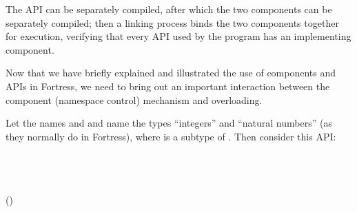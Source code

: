 The API can be separately compiled, after which the
two components can be separately compiled; then a linking
process binds the two components together for execution,
verifying that every API used by the program has an
implementing component.

Now that we have briefly explained and illustrated
the use of components and APIs in Fortress, we need to
bring out an important interaction between the component
(namespace control) mechanism and overloading.

Let the names and  and  name the types
``integers'' and ``natural numbers''
(as they normally do in Fortress), where  is a subtype of .
Then consider this API:
\begin{codeexamplesize}
\begin{FortressCode}
\:  \\
 \\
  \\
\2\+ (\ultrathin)\COLON {}\- \\
 \\
 \\
 
\end{FortressCode}
\end{codeexamplesize}

